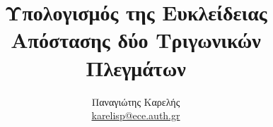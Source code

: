\documentclass[a4paper,12pt]{report}
\def\tl{\textlatin}
\begin{document}


\title{Υπολογισμός της Ευκλείδειας Απόστασης δύο Τριγωνικών Πλεγμάτων}
\author{Παναγιώτης Καρελής \\
\href{mailto:karelisp@ece.auth.gr}{\tl{karelisp@ece.auth.gr}}}
\maketitle

\tableofcontents
\listoffigures
\listofalgorithms
\thispagestyle{empty}








\appendix




{}

\end{document}
